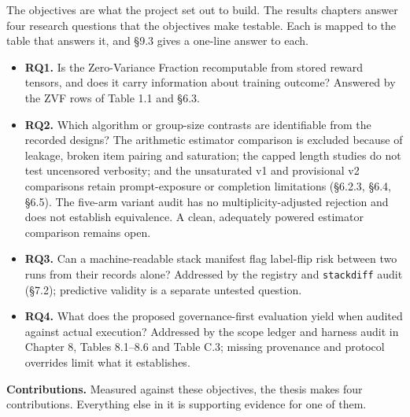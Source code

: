 \documentclass[12pt,a4paper]{report}
\begin{document}
\addtocounter{table}{-1}\endgroup

The objectives are what the project set out to build. The results
chapters answer four research questions that the objectives make
testable. Each is mapped to the table that answers it, and §9.3 gives a
one-line answer to each.

\begin{itemize}
\item
  \textbf{RQ1.} Is the Zero-Variance Fraction recomputable from stored
  reward tensors, and does it carry information about training outcome?
  Answered by the ZVF rows of Table 1.1 and §6.3.
\item
  \textbf{RQ2.} Which algorithm or group-size contrasts are identifiable
  from the recorded designs? The arithmetic estimator comparison is
  excluded because of leakage, broken item pairing and saturation; the
  capped length studies do not test uncensored verbosity; and the
  unsaturated v1 and provisional v2 comparisons retain prompt-exposure
  or completion limitations (§6.2.3, §6.4, §6.5). The five-arm variant
  audit has no multiplicity-adjusted rejection and does not establish
  equivalence. A clean, adequately powered estimator comparison remains
  open.
\item
  \textbf{RQ3.} Can a machine-readable stack manifest flag label-flip
  risk between two runs from their records alone? Addressed by the
  registry and \texttt{stackdiff} audit (§7.2); predictive validity is a
  separate untested question.
\item
  \textbf{RQ4.} What does the proposed governance-first evaluation yield
  when audited against actual execution? Addressed by the scope ledger
  and harness audit in Chapter 8, Tables 8.1--8.6 and Table C.3; missing
  provenance and protocol overrides limit what it establishes.
\end{itemize}

\textbf{Contributions.} Measured against these objectives, the thesis
makes four contributions. Everything else in it is supporting evidence
for one of them.
\end{document}
